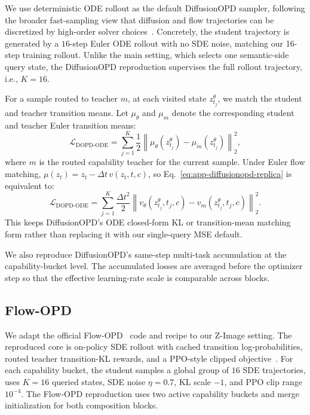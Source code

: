 We use deterministic ODE rollout as the default DiffusionOPD sampler, following the broader fast-sampling view that diffusion and flow trajectories can be discretized by high-order solver choices~\cite{zhao2023unipc,zhang2022fast,lu2025dpm}. Concretely, the student trajectory is generated by a $16$-step Euler ODE rollout with no SDE noise, matching our 16-step training rollout. Unlike the main \name{} setting, which selects one semantic-side query state, the DiffusionOPD reproduction supervises the full rollout trajectory, i.e., $K{=}16$. 

For a sample routed to teacher $m$, at each visited state $z_{t_j}^{\theta}$, we match the student and teacher transition means. Let $\mu_\theta$ and $\mu_m$ denote the corresponding student and teacher Euler transition means:
\begin{equation}
  \mathcal{L}_{\mathrm{DOPD\text{-}ODE}}
  =\sum_{j=1}^{K}\frac{1}{2}
  \left\|\mu_{\theta}(z_{t_j}^{\theta})-
          \mu_m(z_{t_j}^{\theta})\right\|_2^2,
  \label{eq:app-diffusionopd-replica}
\end{equation}
where $m$ is the routed capability teacher for the current sample. Under Euler flow matching,
$\mu(z_t)=z_t-\Delta t\,v(z_t,t,c)$, so Eq.~\eqref{eq:app-diffusionopd-replica} is equivalent to:
\begin{equation}
  \mathcal{L}_{\mathrm{DOPD\text{-}ODE}}
  =\sum_{j=1}^{K}\frac{\Delta t^2}{2}
  \left\|v_{\theta}(z_{t_j}^{\theta},t_j,c)-
          v_m(z_{t_j}^{\theta},t_j,c)\right\|_2^2.
  \label{eq:app-diffusionopd-velocity}
\end{equation}
This keeps DiffusionOPD's ODE closed-form KL or transition-mean matching form rather than replacing it with our single-query MSE default.

We also reproduce DiffusionOPD's same-step multi-task accumulation at the capability-bucket level. The accumulated losses are averaged before the optimizer step so that the effective learning-rate scale is comparable across blocks.


\vspace{0.2cm}


\subsection{Flow-OPD}
\label{app:flowopd-reproduction}

We adapt the official Flow-OPD~\cite{fang2026flow} code and recipe to our Z-Image setting. The reproduced core is on-policy SDE rollout with cached transition log-probabilities, routed teacher transition-KL rewards, and a PPO-style clipped objective~\cite{schulman2017proximal,liu2026flow}. For each capability bucket, the student samples a global group of $16$ SDE trajectories, uses $K{=}16$ queried states, SDE noise $\eta{=}0.7$, KL scale $-1$, and PPO clip range $10^{-4}$. The Flow-OPD reproduction uses two active capability buckets and merge initialization for both composition blocks.

